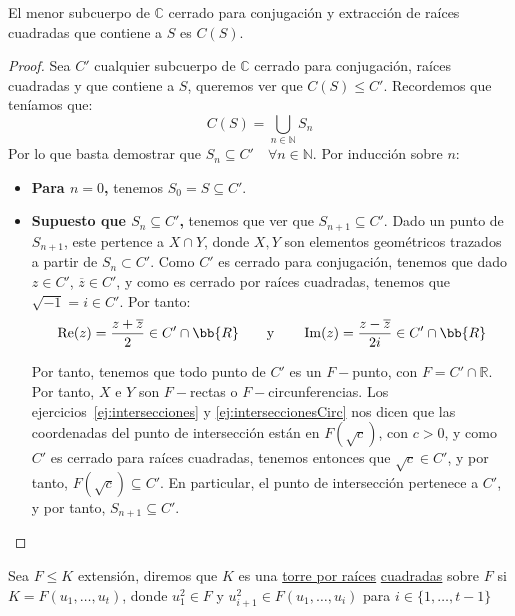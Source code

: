\begin{teo}
    El menor subcuerpo de $\mathbb{C}$ cerrado para conjugación y extracción de raíces cuadradas que contiene a $S$ es $C(S)$.
    \begin{proof}
        Sea $C'$ cualquier subcuerpo de $\mathbb{C}$ cerrado para conjugación, raíces cuadradas y que contiene a $S$, queremos ver que $C(S)\leq C'$. Recordemos que teníamos que:
        \begin{equation*}
            C(S) = \bigcup_{n\in \mathbb{N}} S_n
        \end{equation*}
        Por lo que basta demostrar que $S_n\subseteq C' \quad \forall n\in \mathbb{N}$. Por inducción sobre $n$:
        \begin{itemize}
            \item \textbf{Para $n=0$,} tenemos $S_0 = S\subseteq C'$.
            \item \textbf{Supuesto que $S_n\subseteq C'$,} tenemos que ver que $S_{n+1}\subseteq C'$. Dado un punto de $S_{n+1}$, este pertence a $X\cap Y$, donde $X,Y$ son elementos geométricos trazados a partir de $S_n\subset C'$. Como $C'$ es cerrado para conjugación, tenemos que dado $z\in C'$, $\overline{z}\in C'$, y como es cerrado por raíces cuadradas, tenemos que $\sqrt{-1}=i\in C'$. Por tanto:
            \begin{equation*}
                \Re(z) = \frac{z+\overline{z}}{2} \in C'\cap \bb{R} \qquad \text{y} \qquad \Im(z) = \frac{z-\overline{z}}{2i} \in C'\cap \bb{R}
            \end{equation*}

            Por tanto, tenemos que todo punto de $C'$ es un $F-$punto, con $F=C'\cap \mathbb{R}$. Por tanto, $X$ e $Y$ son $F-$rectas o $F-$circunferencias. Los ejercicios~\ref{ej:intersecciones} y \ref{ej:interseccionesCirc} nos dicen que las coordenadas del punto de intersección están en $F(\sqrt{c})$, con $c>0$, y como $C'$ es cerrado para raíces cuadradas, tenemos entonces que $\sqrt{c}\in C'$, y por tanto, $F(\sqrt{c})\subseteq C'$. En particular, el punto de intersección pertenece a $C'$, y por tanto, $S_{n+1}\subseteq C'$.
        \end{itemize}
    \end{proof}
\end{teo}

\begin{definicion}\label{def:torre_raices_cuadradas}
    Sea $F\leq K$ extensión, diremos que $K$ es una \underline{torre por raíces} \underline{cuadradas} sobre $F$ si $K = F(u_1, \ldots, u_t)$, donde $u_1^2 \in F$ y $u_{i+1}^2 \in F(u_1, \ldots, u_i)$ para $i \in \{1,\ldots,t-1\}$
\end{definicion}

